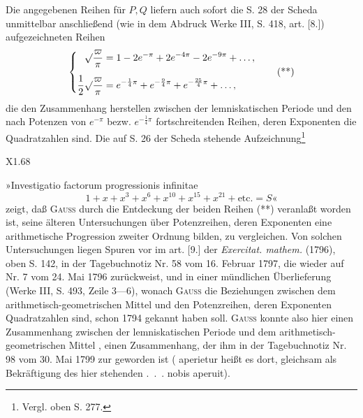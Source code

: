 Die angegebenen Reihen für \(P,Q\) liefern auch sofort die S. 28 der Scheda unmittelbar anschließend (wie in dem Abdruck Werke III, S. 418, art. [8.]) aufgezeichneten Reihen
\begin{equation}
\left\{\begin{aligned}
\surd\frac\varpi\pi&=1-2e^{-\pi}+2e^{-4\pi}-2e^{-9\pi}+\ldots,\\[1ex]
\frac12\surd\frac\varpi\pi&=e^{-\frac14\pi}+e^{-\frac94\pi}+e^{-\frac{25}4\pi}+\ldots,
\end{aligned}\right.\tag*{(**)}
\end{equation}
\noindent die den Zusammenhang herstellen zwischen der lemniskatischen Periode und den nach Potenzen von \(e^{-\pi}\) bezw. \(e^{-\frac14\pi}\) fortschreitenden Reihen, deren Exponenten die Quadratzahlen sind. Die auf S. 26 der Scheda stehende Aufzeichnung\begingroup\renewcommand{\thefootnote}{**)}\footnote{Vergl. oben S. 277.}\endgroup
\par\bigskip\noindent X1.\hfill68\hspace*{.14\linewidth}
\par\endgroup

\clearpage{}
\begingroup\small
\indent »Investigatio factorum progressionis infinitae
\[
1+x+x^3+x^6+x^{10}+x^{15}+x^{21}+\text{etc.}=S\text{«}
\]
\noindent zeigt, daß \textsc{Gauss} durch die Entdeckung der beiden Reihen (**) veranlaßt worden ist, seine älteren Untersuchungen über Potenzreihen, deren Exponenten eine arithmetische Progression zweiter Ordnung bilden, zu vergleichen. Von solchen Untersuchungen liegen Spuren vor im art. [9.] der \textit{Exercitat. mathem.} (1796), oben S. 142, in der Tagebuchnotiz Nr. 58 vom 16. Februar 1797, die wieder auf Nr. 7 vom 24. Mai 1796 zurückweist, und in einer mündlichen Überlieferung (Werke III, S. 493, Zeile 3—6), wonach \textsc{Gauss} die Beziehungen zwischen dem arithmetisch-geometrischen Mittel und den Potenzreihen, deren Exponenten Quadratzahlen sind, schon 1794 gekannt haben soll. \textsc{Gauss} konnte also hier einen Zusammenhang zwischen der lemniskatischen Periode und dem arithmetisch-geometrischen Mittel , einen Zusammenhang, der ihm in der Tagebuchnotiz Nr. 98 vom 30. Mai 1799 zur  geworden ist ( aperietur heißt es dort, gleichsam als Bekräftigung des hier stehenden .\ .\ . nobis aperuit).

